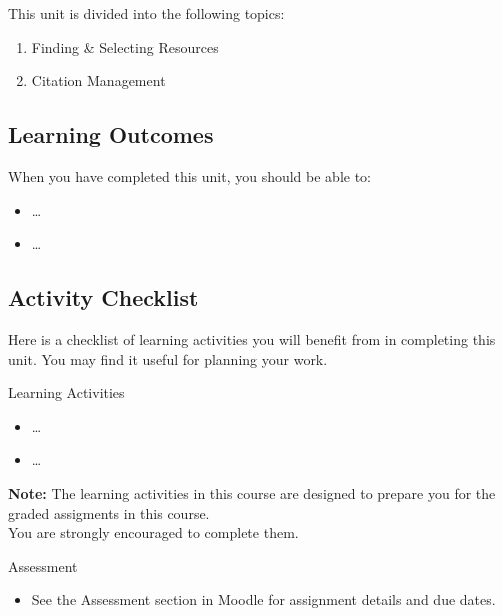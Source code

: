 \documentclass[
]{book}
\providecommand{\tightlist}{%
  \setlength{\itemsep}{0pt}\setlength{\parskip}{0pt}}
\theoremstyle{definition}
\theoremstyle{definition}
\theoremstyle{definition}
\theoremstyle{definition}
\theoremstyle{remark}
\begin{document}
This unit is divided into the following topics:

\begin{enumerate}
\def\labelenumi{\arabic{enumi}.}
\tightlist
\item
  Finding \& Selecting Resources\\
\item
  Citation Management
\end{enumerate}

\hypertarget{learning-outcomes-1}{%
\subsection*{Learning Outcomes}\label{learning-outcomes-1}}

When you have completed this unit, you should be able to:

\begin{itemize}
\tightlist
\item
  \ldots{}
\item
  \ldots{}
\end{itemize}

\hypertarget{activity-checklist-1}{%
\subsection*{Activity Checklist}\label{activity-checklist-1}}

Here is a checklist of learning activities you will benefit from in completing this unit. You may find it useful for planning your work.

\begin{reflect}
{Learning Activities}

\begin{itemize}
\tightlist
\item
  \ldots{}
\item
  \ldots{}
\end{itemize}

\textbf{Note:} The learning activities in this course are designed to prepare you for the graded assigments in this course.\\
You are strongly encouraged to complete them.
\end{reflect}

\begin{assessment}
{Assessment}

\begin{itemize}
\tightlist
\item
  See the Assessment section in Moodle for assignment details and due dates.
\end{itemize}
\end{assessment}
\end{document}
